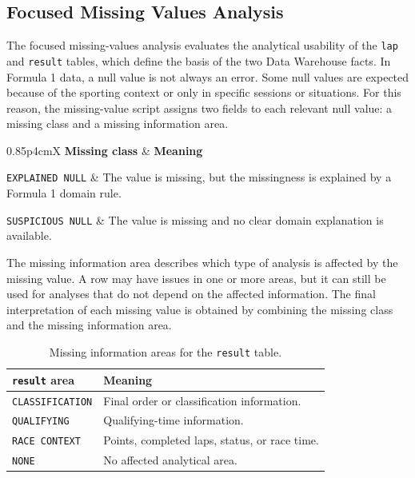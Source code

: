 \documentclass[11pt,a4paper]{article}
\begin{document}
	

	
	\subsection{Focused Missing Values Analysis}
	
	The focused missing-values analysis evaluates the analytical usability of the \texttt{lap} and \texttt{result} tables, which define the basis of the two Data Warehouse facts. In Formula 1 data, a null value is not always an error. Some null values are expected because of the sporting context or only in specific sessions or situations.
	For this reason, the missing-value script assigns two fields to each relevant null value: a missing class and a missing information area.
	
	
	\begin{table}[H]
		\centering
		\caption{Missing value classes used in the focused analysis.}
		\label{tab:missing-classes}
		\begin{tabularx}{0.85\linewidth}{p{4cm}X}
			\toprule
			\textbf{Missing class} & \textbf{Meaning} \\
			\midrule
			

			\texttt{EXPLAINED NULL}
			& The value is missing, but the missingness is explained by a Formula 1 domain rule. \\
			
			\midrule
			
			\texttt{SUSPICIOUS NULL}
			& The value is missing and no clear domain explanation is available. \\
			
			\bottomrule
		\end{tabularx}
	\end{table}
	
	The missing information area describes which type of analysis is affected by the missing value.
	A row may have issues in one or more areas, but it can still be used for analyses that do not depend on the affected information.
	The final interpretation of each missing value is obtained by combining the missing class and the missing information area.
	
	\begin{table}[!htbp]
		\centering
		\caption{Missing information areas for the \texttt{result} table.}
		\label{tab:result-missing-information-areas}
		\begin{tabularx}{0.85\linewidth}{p{3.6cm}X}
			\toprule
			\textbf{\texttt{result} area} & \textbf{Meaning} \\
			\midrule
			\texttt{CLASSIFICATION} & Final order or classification information. \\
			\texttt{QUALIFYING} & Qualifying-time information. \\
			\texttt{RACE CONTEXT} & Points, completed laps, status, or race time. \\
			\texttt{NONE} & No affected analytical area. \\
			\bottomrule
		\end{tabularx}
	\end{table}
	
\end{document}
